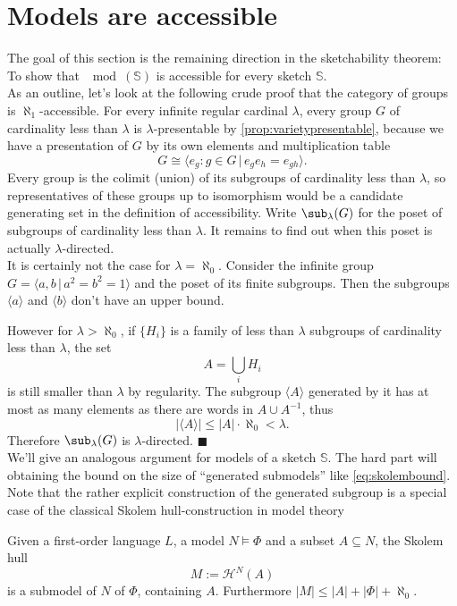 \section{Models are accessible}
\label{sec:sketchesaccessible}


The goal of this section is the remaining direction in the sketchability theorem: To show that $\mod(\mathbb S)$ is accessible for every sketch $\mathbb S$. \\

As an outline, let's look at the following crude proof that the category of groups is $\aleph_1$-accessible. For every infinite regular cardinal $\lambda$, every group $G$ of cardinality less than $\lambda$ is $\lambda$-presentable by \ref{prop:varietypresentable}, because we have a presentation of $G$ by its own elements and multiplication table
\[ G \cong \langle e_g : g \in G \,|\, e_g e_h = e_{gh} \rangle. \]
Every group is the colimit (union) of its subgroups of cardinality less than $\lambda$, so representatives of these groups up to isomorphism would be a candidate generating set in the definition of accessibility. Write $\sub_\lambda(G)$ for the poset of subgroups of cardinality less than $\lambda$. It remains to find out when this poset is actually $\lambda$-directed. \\

It is certainly not the case for $\lambda=\aleph_0$. Consider the infinite group $G=\langle a, b \,|\, a^2 = b^2 = 1 \rangle$ and the poset of its finite subgroups. Then the subgroups $\langle a \rangle$ and $\langle b \rangle$ don't have an upper bound.

However for $\lambda > \aleph_0$, if $\{H_i\}$ is a family of less than $\lambda$ subgroups of cardinality less than $\lambda$, the set \[ A = \bigcup_i H_i \]
is still smaller than $\lambda$ by regularity. The subgroup $\langle A \rangle$ generated by it has at most as many elements as there are words in $A \cup A^{-1}$, thus
\begin{equation} |\langle A \rangle| \leq |A|\cdot \aleph_0 < \lambda. \label{eq:skolembound} \end{equation}
Therefore $\sub_\lambda(G)$ is $\lambda$-directed. $\blacksquare$ \\

We'll give an analogous argument for models of a sketch $\mathbb S$. The hard part will obtaining the bound on the size of ``generated submodels'' like \eqref{eq:skolembound}. Note that the rather explicit construction of the generated subgroup is a special case of the classical Skolem hull-construction in model theory
\begin{Theorem}
Given a first-order language $L$, a model $N \models \Phi$ and a subset $A \subseteq N$, the Skolem hull
\[ M := \mathcal H^N(A) \]
is a submodel of $N$ of $\Phi$, containing $A$. Furthermore $|M| \leq |A| + |\Phi| + \aleph_0$. 
\end{Theorem}

